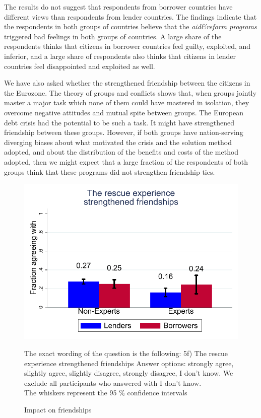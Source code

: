 The results do not suggest that respondents from borrower countries have different views than respondents from lender countries. The findings indicate that the respondents
in both groups of countries believe that the \textit{aid\&reform programs} triggered
bad feelings in both groups of countries. A large share of the respondents
thinks that citizens in borrower countries feel guilty, exploited, and
inferior, and a large share of respondents also thinks that citizens in
lender countries feel disappointed and exploited as well. 

We have also asked whether the  strengthened friendship between the citizens in the Eurozone. The theory of groups and conflicts shows that, when groups jointly master a major task which none of them could have mastered in isolation, they overcome negative attitudes and mutual spite between groups. The European debt crisis had the potential to be 
such a task. It might have strengthened friendship between these groups.
However, if both groups have nation-serving diverging biases about what
motivated the crisis and the solution method adopted, and about the
distribution of the benefits and costs of the method adopted, then we might
expect that a large fraction of the respondents of both groups think that
these programs did not strengthen friendship ties. 
\begin{figure}
\begin{center}
\caption{Impact on friendships}
\includegraphics[scale=0.5]{graph5_3.pdf}
\label{fig:figure5}
\end{center}
\tiny 
\begin{tablenotes}
  {The exact wording of the question is the following: 5f) The rescue experience strengthened friendships
   Answer options: strongly agree, slightly agree, slightly disagree, strongly disagree, I don't know. We exclude all participants who answered with I don't know. \\
     The whiskers represent the 95 \% confidence intervals}
    \end{tablenotes}
\end{figure}

